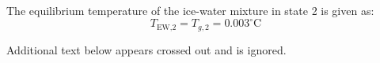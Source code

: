 The equilibrium temperature of the ice-water mixture in state 2 is given as:  
\[
T_{\text{EW,2}} = T_{g,2} = 0.003^\circ\text{C}
\]  

Additional text below appears crossed out and is ignored.